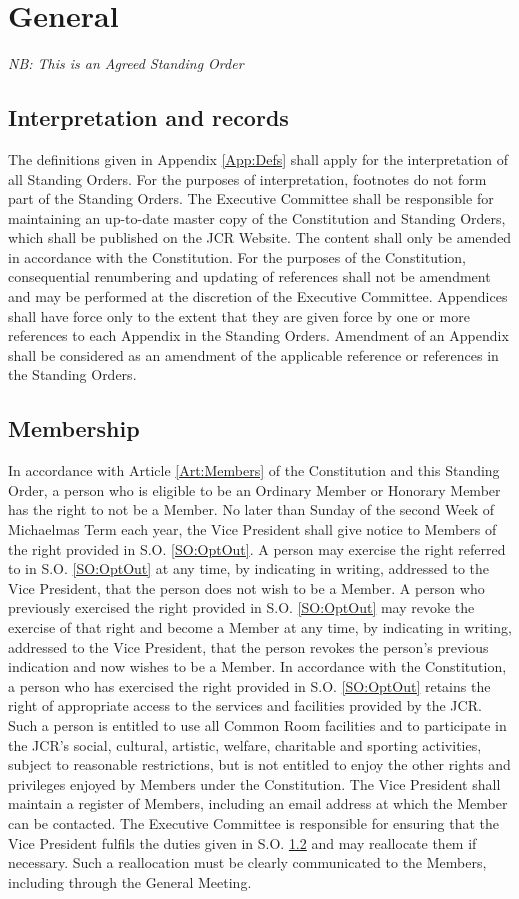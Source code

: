\chapter{General}
\textit{NB: This is an Agreed Standing Order}
\section{Interpretation and records}
\npara The definitions given in Appendix \ref{App:Defs} shall apply for the interpretation of all Standing Orders.
For the purposes of interpretation, footnotes do not form part of the Standing Orders.
\npara The Executive Committee shall be responsible for maintaining an up-to-date master copy of the Constitution and Standing Orders, which shall be published on the JCR Website.
The content shall only be amended in accordance with the Constitution.
\npara For the purposes of the Constitution, consequential renumbering and updating of references shall not be amendment and may be performed at the discretion of the Executive Committee.
\npara Appendices shall have force only to the extent that they are given force by one or more references to each Appendix in the Standing Orders.  Amendment of an Appendix shall be considered as an amendment of the applicable reference or references in the Standing Orders.
\section{Membership} \label{SO:Membership}
\npara \label{SO:OptOut} In accordance with Article \ref{Art:Members} of the Constitution and this Standing Order, a person who is eligible to be an Ordinary Member or Honorary Member has the right to not be a Member.
\npara No later than Sunday of the second Week of Michaelmas Term each year, the Vice President shall give notice to Members of the right provided in S.O. \ref{SO:OptOut}.
\npara A person may exercise the right referred to in S.O. \ref{SO:OptOut} at any time, by indicating in writing, addressed to the Vice President, that the person does not wish to be a Member.
\npara A person who previously exercised the right provided in S.O. \ref{SO:OptOut} may revoke the exercise of that right and become a Member at any time, by indicating in writing, addressed to the Vice President, that the person revokes the person's previous indication and now wishes to be a Member.
\npara In accordance with the Constitution, a person who has exercised the right provided in S.O. \ref{SO:OptOut} retains the right of appropriate access to the services and facilities provided by the JCR.
Such a person is entitled to use all Common Room facilities and to participate in the JCR's social, cultural, artistic, welfare, charitable and sporting activities, subject to reasonable restrictions, but is not entitled to enjoy the other rights and privileges enjoyed by Members under the Constitution.
\npara The Vice President shall maintain a register of Members, including an email address at which the Member can be contacted.
\npara The Executive Committee is responsible for ensuring that the Vice President fulfils the duties given in S.O. \ref{SO:Membership} and may reallocate them if necessary.
Such a reallocation must be clearly communicated to the Members, including through the General Meeting.

